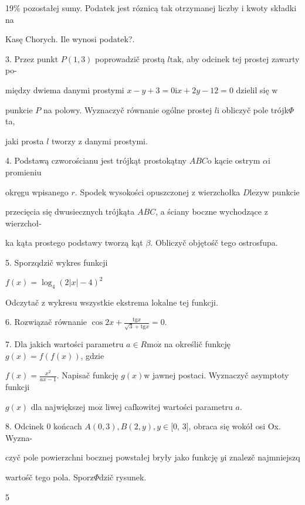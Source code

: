 \documentclass[a4paper,12pt]{article}
\begin{document}
19\% pozostałej sumy. Podatek jest róznicą tak otrzymanej liczby $\mathrm{i}$ kwoty składki na

Kasę Chorych. Ile wynosi podatek?.

3. Przez punkt $P(1,3)$ poprowadzič prostą $l\mathrm{t}\mathrm{a}\mathrm{k}$, aby odcinek tej prostej zawarty po-

między dwiema danymi prostymi $x-y+3 = 0 \mathrm{i}x+2y-12 = 0$ dzielil się $\mathrm{w}$

punkcie $P$ na polowy. Wyznaczyč równanie ogólne prostej $l\mathrm{i}$ obliczyč pole trójk$\Phi$ta,

jaki prosta $l$ tworzy $\mathrm{z}$ danymi prostymi.

4. Podstawą czworościanu jest trójkąt prostokątny $ABC\mathrm{o}$ kącie ostrym $\alpha \mathrm{i}$ promieniu

okręgu wpisanego $r$. Spodek wysokości opuszczonej $\mathrm{z}$ wierzchołka $D\mathrm{l}\mathrm{e}\dot{\mathrm{z}}\mathrm{y}\mathrm{w}$ punkcie

przecięcia się dwusiecznych trójkąta $ABC$, a ściany boczne wychodzące $\mathrm{z}$ wierzchoł-

ka kąta prostego podstawy tworzą kąt $\beta$. Obliczyč objętośč tego ostrosfupa.

5. Sporzqdzič wykres funkcji

$f(x)=\log_{4}(2|x|-4)^{2}$

Odczytač $\mathrm{z}$ wykresu wszystkie ekstrema lokalne tej funkcji.

6. Rozwiązač równanie $\displaystyle \cos 2x+\frac{\mathrm{t}\mathrm{g}x}{\sqrt{3}+\mathrm{t}\mathrm{g}x}=0.$

7. Dla jakich wartości parametru $a\in R\mathrm{m}\mathrm{o}\dot{\mathrm{z}}$ na określič funkcję $g(x)=f(f(x))$, gdzie

$f(x)=\displaystyle \frac{x^{2}}{ax-1}$. Napisač funkcję $g(x)\mathrm{w}$ jawnej postaci. Wyznaczyč asymptoty funkcji

$g(x)$ dla największej $\mathrm{m}\mathrm{o}\dot{\mathrm{z}}$ liwej cafkowitej wartości parametru $a.$

8. Odcinek $0$ końcach $A(0,3), B(2,y), y \in [0$, 3$]$, obraca się wokół osi Ox. Wyzna-

czyč pole powierzchni bocznej powstałej bryły jako funkcję $y\mathrm{i}$ znalez$\acute{}$č najmniejszq

wartośč tego pola. Sporz$\Phi$dzič rysunek.

5
\end{document}
